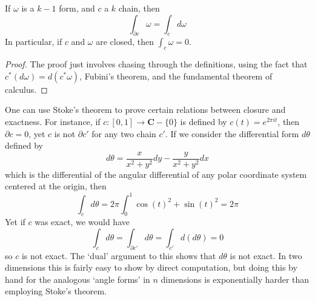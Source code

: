\begin{theorem}
    If $\omega$ is a $k-1$ form, and $c$ a $k$ chain, then
    \[ \int_{\partial c} \omega =  \int_c d \omega \]
    In particular, if $c$ and $\omega$ are closed, then $\int_c \omega = 0$.
\end{theorem}
\begin{proof}
    The proof just involves chasing through the definitions, using the fact that $c^*(d \omega) = d(c^* \omega)$, Fubini's theorem, and the fundamental theorem of calculus.
\end{proof}

One can use Stoke's theorem to prove certain relations between closure and exactness. For instance, if $c: [0,1] \to \mathbf{C} - \{ 0 \}$ is defined by $c(t) = e^{2 \pi it}$, then $\partial c = 0$, yet $c$ is not $\partial c'$ for any two chain $c'$. If we consider the differential form $d\theta$ defined by
%
\[ d\theta = \frac{x}{x^2 + y^2} dy - \frac{y}{x^2 + y^2} dx \]
%
which is the differential of the angular differential of any polar coordinate system centered at the origin, then
%
\[ \int_c d\theta = 2\pi \int_0^1 \cos(t)^2 + \sin(t)^2 = 2\pi \]
%
Yet if $c$ was exact, we would have
%
\[ \int_c d\theta = \int_{\partial c'} d\theta = \int_{c'} d(d\theta) = 0 \]
%
so $c$ is not exact. The `dual' argument to this shows that $d\theta$ is not exact. In two dimensions this is fairly easy to show by direct computation, but doing this by hand for the analogous `angle forms' in $n$ dimensions is exponentially harder than employing Stoke's theorem.

